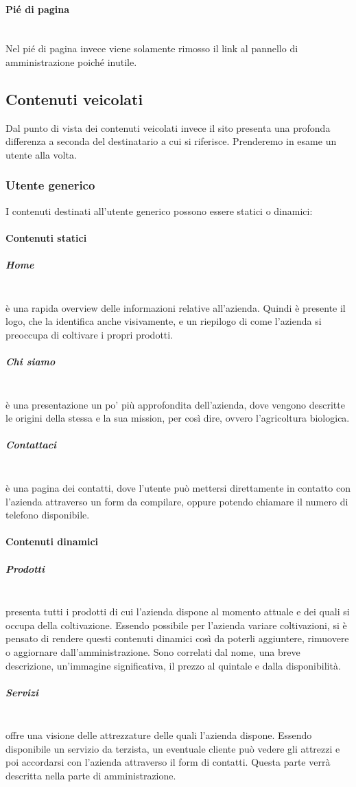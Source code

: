 \paragraph{Pié di pagina}
~\\Nel pié di pagina invece viene solamente rimosso il link al pannello di amministrazione poiché inutile.

\subsection{Contenuti veicolati}
Dal punto di vista dei contenuti veicolati invece il sito presenta una profonda differenza a seconda del destinatario a cui si riferisce. Prenderemo in esame un utente alla volta.
\subsubsection{Utente generico}
I contenuti destinati all'utente generico possono essere statici o dinamici:
\paragraph{Contenuti statici}
\subparagraph{Home}
~\\è una rapida overview delle informazioni relative all'azienda. Quindi è presente il logo, che la identifica anche visivamente, e un riepilogo di come l'azienda si preoccupa di coltivare i propri prodotti.
\subparagraph{Chi siamo}
~\\è una presentazione un po' più approfondita dell'azienda, dove vengono descritte le origini della stessa e la sua mission, per così dire, ovvero l'agricoltura biologica.
\subparagraph{Contattaci}
~\\è una pagina dei contatti, dove l'utente può mettersi direttamente in contatto con l'azienda attraverso un form da compilare, oppure potendo chiamare il numero di telefono disponibile.
\paragraph{Contenuti dinamici}
\subparagraph{Prodotti} 
~\\presenta tutti i prodotti di cui l'azienda dispone al momento attuale e dei quali si occupa della coltivazione. Essendo possibile per l'azienda variare coltivazioni, si è pensato di rendere questi contenuti dinamici così da poterli aggiuntere, rimuovere o aggiornare dall'amministrazione. Sono correlati dal nome, una breve descrizione, un'immagine significativa, il prezzo al quintale e dalla disponibilità.
\subparagraph{Servizi} 
~\\offre una visione delle attrezzature delle quali l'azienda dispone. Essendo disponibile un servizio da terzista, un eventuale cliente può vedere gli attrezzi e poi accordarsi con l'azienda attraverso il form di contatti. Questa parte verrà descritta nella parte di amministrazione.

